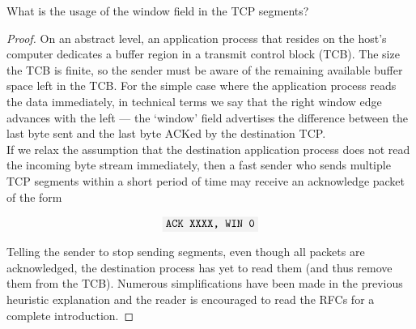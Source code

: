 \documentclass[../main.tex]{subfiles}
\begin{document}
\begin{wts}
	What is the usage of the window field in the TCP segments?
\end{wts}
\begin{proof}
    On an abstract level, an application process that resides on the host’s computer dedicates a buffer region in a transmit control block (TCB). The size the TCB is finite, so the sender must be aware of the remaining available buffer space left in the TCB. For the simple case where the application process reads the data immediately, in technical terms we say that the right window edge advances with the left — the ‘window’ field advertises the difference between the last byte sent and the last byte ACKed by the destination TCP.\\

    If we relax the assumption that the destination application process does not read the incoming byte stream immediately, then a fast sender who sends multiple TCP segments within a short period of time may receive an acknowledge packet of the form
    
    \[\code{ACK XXXX, WIN 0}\]
    
    Telling the sender to stop sending segments, even though all packets are acknowledged, the destination process has yet to read them (and thus remove them from the TCB). Numerous simplifications have been made in the previous heuristic explanation and the reader is encouraged to read the RFCs for a complete introduction.
\end{proof}
\newpage
\end{document}
